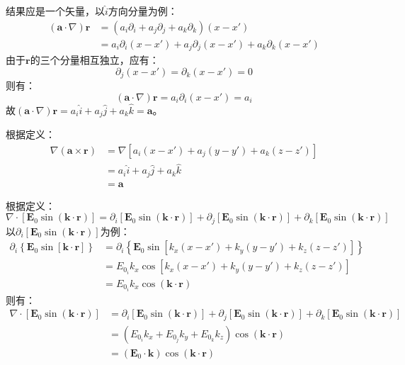 \documentclass[a4paper,fontset=none]{ctexart}
\begin{document}
\begin{itemize}
        \textparagraph 结果应是一个矢量，以$\hat{i}$方向分量为例：
        \begin{align*}
            (\bm{a}\cdot\nabla)\bm{r}
            &= (a_i\partial_i + a_j\partial_j + a_k\partial_k)(x-x') \\
            &= a_i\partial_i(x-x') + a_j\partial_j(x-x') + a_k\partial_k(x-x')
        \end{align*}
        由于$\bm{r}$的三个分量相互独立，应有：
        \[
            \partial_j(x-x') = \partial_k(x-x') = 0
        \]
        则有：
        \[
            (\bm{a}\cdot\nabla)\bm{r} = a_i\partial_i(x-x') = a_i
        \]
        故$(\bm{a}\cdot\nabla)\bm{r} = a_i\hat{i} + a_j\hat{j} + a_k\hat{k} = \bm{a}$。

        \textparagraph 根据定义：
        \begin{align*}
            \nabla(\bm{a}\times\bm{r})
            &= \nabla\left[a_i(x-x') + a_j(y-y') + a_k(z-z')\right] \\
            &= a_i\hat{i} + a_j\hat{j} + a_k\hat{k} \\
            &= \bm{a}
        \end{align*}

        \textparagraph 根据定义：
        \[
            \nabla\cdot[\bm{E}_0\sin(\bm{k}\cdot\bm{r})] = \partial_i[\bm{E}_0\sin(\bm{k}\cdot\bm{r})] + \partial_j[\bm{E}_0\sin(\bm{k}\cdot\bm{r})] + \partial_k[\bm{E}_0\sin(\bm{k}\cdot\bm{r})]
        \]
        以$\partial_i[\bm{E}_0\sin(\bm{k}\cdot\bm{r})]$为例：
        \begin{align*}
            \partial_i\left\{\bm{E}_0\sin[\bm{k}\cdot\bm{r}]\right\}
            &= \partial_i\left\{\bm{E}_0\sin\left[k_x(x-x') + k_y(y-y') + k_z(z-z')\right]\right\} \\
            &= E_{0_i}k_x\cos\left[k_x(x-x') + k_y(y-y') + k_z(z-z')\right] \\
            &= E_{0_i}k_x\cos(\bm{k}\cdot\bm{r})
        \end{align*}
        则有：
        \begin{align*}
            \nabla\cdot[\bm{E}_0\sin(\bm{k}\cdot\bm{r})]
            &= \partial_i[\bm{E}_0\sin(\bm{k}\cdot\bm{r})] + \partial_j[\bm{E}_0\sin(\bm{k}\cdot\bm{r})] + \partial_k[\bm{E}_0\sin(\bm{k}\cdot\bm{r})] \\
            &= \left(E_{0_i}k_x + E_{0_j}k_y + E_{0_k}k_z\right)\cos(\bm{k}\cdot\bm{r}) \\
            &= (\bm{E}_0\cdot\bm{k})\cos(\bm{k}\cdot\bm{r})
        \end{align*}


\end{itemize}
\end{document}
